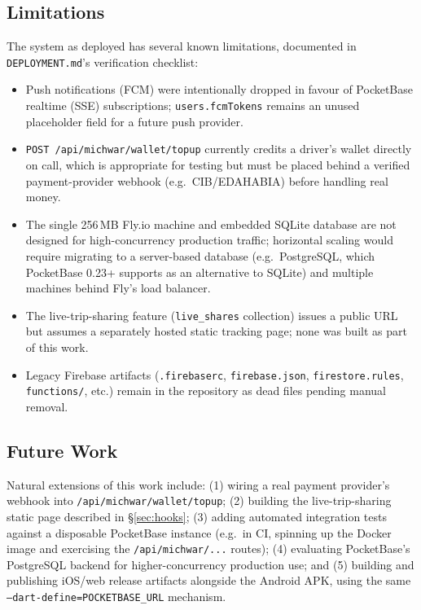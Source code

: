 \documentclass[11pt,a4paper]{article}
\begin{document}
\subsection{Limitations}

The system as deployed has several known limitations, documented in
\texttt{DEPLOYMENT.md}'s verification checklist:

\begin{itemize}[nosep]
  \item Push notifications (FCM) were intentionally dropped in favour of
    PocketBase realtime (SSE) subscriptions; \texttt{users.fcmTokens} remains
    an unused placeholder field for a future push provider.
  \item \texttt{POST /api/michwar/wallet/topup} currently credits a driver's
    wallet directly on call, which is appropriate for testing but must be
    placed behind a verified payment-provider webhook (e.g.\ CIB/EDAHABIA)
    before handling real money.
  \item The single 256\,MB Fly.io machine and embedded SQLite database are
    not designed for high-concurrency production traffic; horizontal scaling
    would require migrating to a server-based database (e.g.\ PostgreSQL,
    which PocketBase 0.23+ supports as an alternative to SQLite) and
    multiple machines behind Fly's load balancer.
  \item The live-trip-sharing feature (\texttt{live\_shares} collection) issues
    a public URL but assumes a separately hosted static tracking page; none
    was built as part of this work.
  \item Legacy Firebase artifacts (\texttt{.firebaserc}, \texttt{firebase.json},
    \texttt{firestore.rules}, \texttt{functions/}, etc.) remain in the repository
    as dead files pending manual removal.
\end{itemize}

\subsection{Future Work}

Natural extensions of this work include: (1) wiring a real payment
provider's webhook into \texttt{/api/michwar/wallet/topup}; (2) building the
live-trip-sharing static page described in \S\ref{sec:hooks}; (3) adding
automated integration tests against a disposable PocketBase instance
(e.g.\ in CI, spinning up the Docker image and exercising the
\texttt{/api/michwar/...} routes); (4) evaluating PocketBase's PostgreSQL
backend for higher-concurrency production use; and (5) building and
publishing iOS/web release artifacts alongside the Android APK, using the
same \texttt{--dart-define=POCKETBASE\_URL} mechanism.
\end{document}
